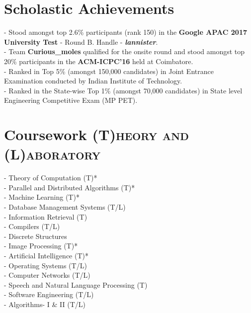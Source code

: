 \documentclass[a4paper,10pt]{extarticle} %
\begin{document}
\section{\large{Scholastic Achievements}}

\small{- Stood amongst top 2.6\% participants (rank 150) in the \textbf{Google APAC 2017 University Test} - Round B. Handle - \textbf{\textit{lannister}}}.\\
\small{- Team \textbf{\textbf{Curious\_moles}} qualified for the onsite round and stood amongst top 20\% participants in the \textbf{ACM-ICPC'16} held at Coimbatore.} \\
\small{- Ranked in Top 5\% (amongst 150,000 candidates) in Joint Entrance Examination conducted by Indian Institute of Technology.} \\
\small{- Ranked in the State-wise Top 1\% (amongst 70,000 candidates) in State level Engineering Competitive Exam (MP PET).}

\section{\large{Coursework}
\hfill\small\textsc{(T)heory and (L)aboratory}}

\begin{multicols}{2}
- Theory of Computation (T)* \\
- Parallel and Distributed Algorithms (T)* \\
- Machine Learning (T)* \\
- Database Management Systems (T/L) \\
- Information Retrieval (T) \\
- Compilers (T/L) \\
- Discrete Structures \\

- Image Processing (T)* \\
- Artificial Intelligence (T)* \\
- Operating Systems (T/L) \\
- Computer Networks (T/L) \\
- Speech and Natural Language Processing (T) \\
- Software Engineering (T/L) \\
- Algorithms- I \& II (T/L) \\

\end{multicols}
\end{document}
